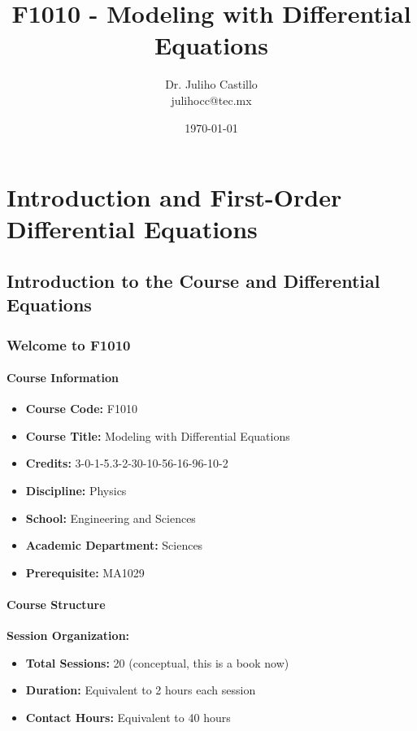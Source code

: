 \documentclass[12pt, letterpaper]{book}
\title{F1010 - Modeling with Differential Equations}
\author{Dr. Juliho Castillo\\julihocc@tec.mx}
\date{\today} %
\begin{document}
\frontmatter %
\maketitle

\tableofcontents

\mainmatter %

\part{Introduction and First-Order Differential Equations}
\label{part:intro_and_first_order_de}

\chapter{Introduction to the Course and Differential Equations}
\label{chap:introduction}

\section{Welcome to F1010}
\label{sec:welcome}

\subsection{Course Information}
\label{ssec:course_info}
\begin{itemize}
    \item \textbf{Course Code:} F1010
    \item \textbf{Course Title:} Modeling with Differential Equations
    \item \textbf{Credits:} 3-0-1-5.3-2-30-10-56-16-96-10-2
    \item \textbf{Discipline:} Physics
    \item \textbf{School:} Engineering and Sciences
    \item \textbf{Academic Department:} Sciences
    \item \textbf{Prerequisite:} MA1029
\end{itemize}

\subsection{Course Structure}
\label{ssec:course_structure}
\textbf{Session Organization:}
\begin{itemize}
    \item \textbf{Total Sessions:} 20 (conceptual, this is a book now)
    \item \textbf{Duration:} Equivalent to 2 hours each session
    \item \textbf{Contact Hours:} Equivalent to 40 hours
\end{itemize}
\end{document}
